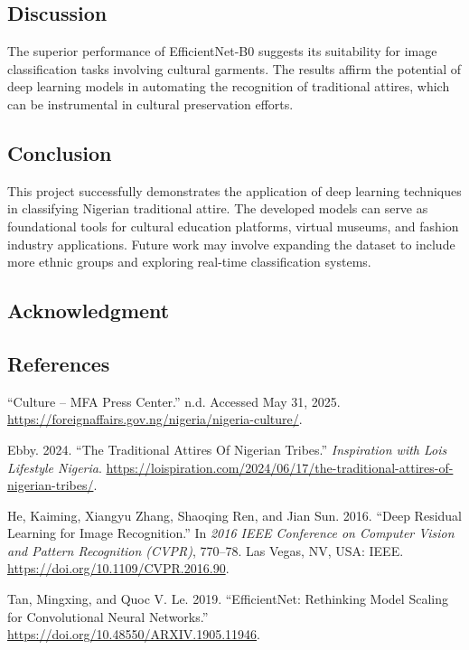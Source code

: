 \documentclass[
  letterpaper,
  DIV=11,
  numbers=noendperiod]{scrartcl}
\newlength{\cslhangindent}
\newenvironment{CSLReferences}[2] %
 {\begin{list}{}{%
  \setlength{\itemindent}{0pt}
  \setlength{\leftmargin}{0pt}
  \setlength{\parsep}{0pt}
  \ifodd #1
   \setlength{\leftmargin}{\cslhangindent}
   \setlength{\itemindent}{-1\cslhangindent}
  \fi
  \setlength{\itemsep}{#2\baselineskip}}}
 {\end{list}}
\begin{document}
\subsection{Discussion}\label{discussion}

The superior performance of EfficientNet-B0 suggests its suitability for
image classification tasks involving cultural garments. The results
affirm the potential of deep learning models in automating the
recognition of traditional attires, which can be instrumental in
cultural preservation efforts.

\subsection{Conclusion}\label{conclusion}

This project successfully demonstrates the application of deep learning
techniques in classifying Nigerian traditional attire. The developed
models can serve as foundational tools for cultural education platforms,
virtual museums, and fashion industry applications. Future work may
involve expanding the dataset to include more ethnic groups and
exploring real-time classification systems.

\subsection{Acknowledgment}\label{acknowledgment}

\subsection*{References}\label{references}

\label{refs}
\begin{CSLReferences}{1}{0}
{``Culture -- {MFA} {Press} {Center}.''} n.d. Accessed May 31, 2025.
\url{https://foreignaffairs.gov.ng/nigeria/nigeria-culture/}.

Ebby. 2024. {``The {Traditional} {Attires} {Of} {Nigerian} {Tribes}.''}
\emph{Inspiration with Lois{\textbar} Lifestyle {\textbar} Nigeria}.
\url{https://loispiration.com/2024/06/17/the-traditional-attires-of-nigerian-tribes/}.

He, Kaiming, Xiangyu Zhang, Shaoqing Ren, and Jian Sun. 2016. {``Deep
{Residual} {Learning} for {Image} {Recognition}.''} In \emph{2016 {IEEE}
{Conference} on {Computer} {Vision} and {Pattern} {Recognition}
({CVPR})}, 770--78. Las Vegas, NV, USA: IEEE.
\url{https://doi.org/10.1109/CVPR.2016.90}.

Tan, Mingxing, and Quoc V. Le. 2019. {``{EfficientNet}: {Rethinking}
{Model} {Scaling} for {Convolutional} {Neural} {Networks}.''}
\url{https://doi.org/10.48550/ARXIV.1905.11946}.

\end{CSLReferences}
\end{document}

